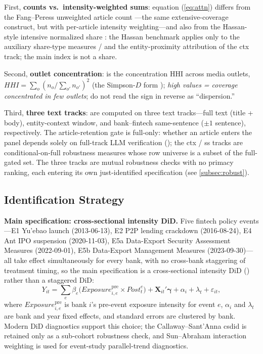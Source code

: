 First, \textbf{counts vs.\ intensity-weighted sums}: equation (\ref{eq:attn})
differs from the Fang--Peress unweighted article count
\parencite{fang2009media}---the same extensive-coverage construct, but with
per-article intensity weighting---and also from the Hassan-style intensive
normalized share \parencite{hassan2019firm}: the Hassan benchmark applies only
to the auxiliary share-type measures  /
 and the entity-proximity attribution of
the ctx track; the main index is not a share.

Second, \textbf{outlet concentration}:  is the
concentration HHI across media outlets, $\mathit{HHI} = \sum_o (n_o /
\sum_{o'} n_{o'})^2$ (the Simpson-$D$ form \parencite{simpson1949diversity});
\emph{high values = coverage concentrated in few outlets}; do not read the
sign in reverse as ``dispersion.''

Third, \textbf{three text tracks}: 
are computed on three text tracks---full text (title + body), entity-context
window, and bank--fintech same-sentence ($\pm 1$ sentence), respectively. The
article-retention gate is full-only: whether an article enters the panel
depends solely on full-track LLM verification ();
the ctx / ss tracks are conditional-on-full robustness measures whose row
universe is a subset of the full-gated set. The three tracks are mutual
robustness checks with no primacy ranking, each entering its own
just-identified specification (see \ref{subsec:robust}).

\subsection{Identification Strategy}\label{subsec:ident}
\textbf{Main specification: cross-sectional intensity DiD.} Five fintech
policy events---E1 Yu'ebao launch (2013-06-13), E2 P2P lending crackdown
(2016-08-24), E4 Ant IPO suspension (2020-11-03), E5a Data-Export Security
Assessment Measures (2022-09-01), E5b Data-Export Management Measures
(2023-09-30)---all take effect simultaneously for every bank, with no
cross-bank staggering of treatment timing, so the main specification is a
cross-sectional intensity DiD () rather
than a staggered DiD:
\begin{equation}\label{eq:did}
Y_{it} = \sum_{e} \beta_e \bigl(\mathit{Exposure}^{\mathrm{pre}}_{i,e}
\times \mathit{Post}^{e}_{t}\bigr) + \mathbf{X}_{it}'\boldsymbol{\gamma}
+ \alpha_i + \lambda_t + \varepsilon_{it},
\end{equation}
where $\mathit{Exposure}^{\mathrm{pre}}_{i,e}$ is bank $i$'s pre-event
exposure intensity for event $e$, $\alpha_i$ and $\lambda_t$ are bank and year
fixed effects, and standard errors are clustered by bank. Modern DiD
diagnostics \parencite{baker2022staggered} support this choice; the
Callaway--Sant'Anna csdid \parencite{callaway2021difference} is retained only
as a sub-cohort robustness check, and Sun--Abraham interaction weighting
\parencite{sun2021estimating} is used for event-study parallel-trend
diagnostics.

